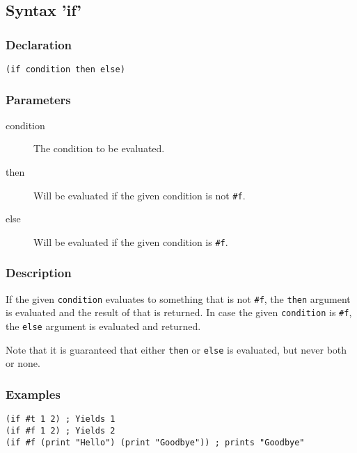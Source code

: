 \subsection{Syntax 'if'}
\label{builtins/if}

\subsubsection*{Declaration}
\begin{lstlisting}
(if condition then else)
\end{lstlisting}

\subsubsection*{Parameters}
\begin{description}
	\item[condition] The condition to be evaluated.
	\item[then] Will be evaluated if the given condition is not \lstinline|#f|.
	\item[else] Will be evaluated if the given condition is \lstinline|#f|.
\end{description}

\subsubsection*{Description}
If the given \lstinline|condition| evaluates to something that is not \lstinline|#f|, the \lstinline|then| argument is evaluated and the result of that is returned. In case the given \lstinline|condition| is \lstinline|#f|, the \lstinline|else| argument is evaluated and returned.

Note that it is guaranteed that either \lstinline|then| or \lstinline|else| is evaluated, but never both or none.

\subsubsection*{Examples}
\begin{lstlisting}
(if #t 1 2) ; Yields 1
(if #f 1 2) ; Yields 2
(if #f (print "Hello") (print "Goodbye")) ; prints "Goodbye"
\end{lstlisting}
